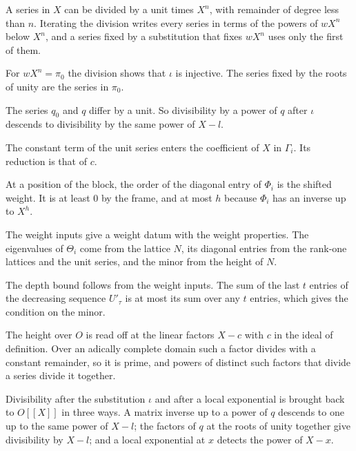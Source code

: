 A series in $X$ can be divided by a unit times $X^n$, with remainder of degree less than $n$. Iterating
the division writes every series in terms of the powers of $wX^n$ below $X^n$, and a series fixed by a
substitution that fixes $wX^n$ uses only the first of them.

For $wX^n=\pi_0$ the division shows that $\iota$ is injective. The series fixed by the roots of unity
are the series in $\pi_0$.

The series $q_0$ and $q$ differ by a unit. So divisibility by a power of $q$ after $\iota$ descends to
divisibility by the same power of $X-l$.

The constant term of the unit series enters the coefficient of $X$ in $\Gamma_i$. Its reduction is that
of $c$.

At a position of the block, the order of the diagonal entry of $\Phi_i$ is the shifted weight. It is at
least $0$ by the frame, and at most $h$ because $\Phi_i$ has an inverse up to $X^h$.

The weight inputs give a weight datum with the weight properties. The eigenvalues of $\Theta_i$ come
from the lattice $N$, its diagonal entries from the rank-one lattices and the unit series, and the
minor from the height of $N$.

The depth bound follows from the weight inputs. The sum of the last $t$ entries of the decreasing
sequence $U'_\tau$ is at most its sum over any $t$ entries, which gives the condition on the minor.

The height over $O$ is read off at the linear factors $X-c$ with $c$ in the ideal of definition. Over an
adically complete domain such a factor divides with a constant remainder, so it is prime, and powers of
distinct such factors that divide a series divide it together.

Divisibility after the substitution $\iota$ and after a local exponential is brought back to $O[[X]]$ in
three ways. A matrix inverse up to a power of $q$ descends to one up to the same power of $X-l$; the
factors of $q$ at the roots of unity together give divisibility by $X-l$; and a local exponential at
$x$ detects the power of $X-x$.

